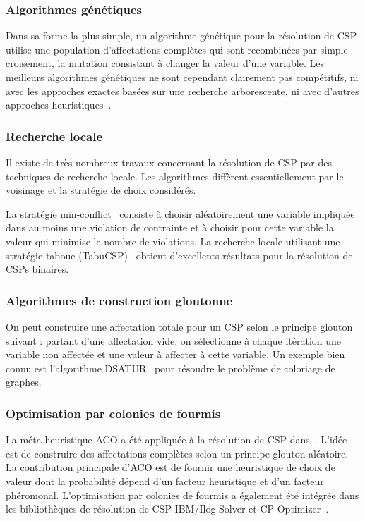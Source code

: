 \documentclass[12pt,a4paper]{book}
\begin{document}
\subsubsection*{Algorithmes génétiques}

Dans sa forme la plus simple, un algorithme génétique pour la résolution de CSP utilise une population d'affectations complètes qui sont recombinées par simple croisement, la mutation consistant à changer la valeur d'une variable. Les meilleurs algorithmes génétiques ne sont cependant clairement pas compétitifs, ni avec les approches exactes basées sur une recherche arborescente, ni avec d'autres approches heuristiques~\cite{hemert2004}.

\subsubsection*{Recherche locale}

Il existe de très nombreux travaux concernant la résolution de CSP par des techniques de recherche locale. Les algorithmes diffèrent essentiellement par le voisinage et la stratégie de choix considérés.

La stratégie min-conflict~\cite{minton1992} consiste à choisir aléatoirement une variable impliquée dans au moins une violation de contrainte et à choisir pour cette variable la valeur qui minimise le nombre de violations. La recherche locale utilisant une stratégie taboue (TabuCSP)~\cite{galinier1997} obtient d'excellents résultats pour la résolution de CSPs binaires.

\subsubsection*{Algorithmes de construction gloutonne}

On peut construire une affectation totale pour un CSP selon le principe glouton suivant : partant d'une affectation vide, on sélectionne à chaque itération une variable non affectée et une valeur à affecter à cette variable. Un exemple bien connu est l'algorithme DSATUR~\cite{brelaz1979} pour résoudre le problème de coloriage de graphes.

\subsubsection*{Optimisation par colonies de fourmis}

La méta-heuristique ACO a été appliquée à la résolution de CSP dans~\cite{solnon2002,solnon2008}. L'idée est de construire des affectations complètes selon un principe glouton aléatoire. La contribution principale d'ACO est de fournir une heuristique de choix de valeur dont la probabilité dépend d'un facteur heuristique et d'un facteur phéromonal. L'optimisation par colonies de fourmis a également été intégrée dans les bibliothèques de résolution de CSP IBM/Ilog Solver et CP Optimizer~\cite{khichane2008,khichane2010}.
\end{document}
